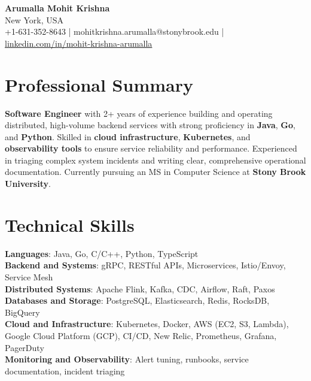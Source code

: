 \documentclass[letterpaper,11pt]{article}
\begin{document}
\begin{center}
  {\Large \textbf{Arumalla Mohit Krishna}} \\
  New York, USA \\
  +1-631-352-8643 \enspace | \enspace mohitkrishna.arumalla@stonybrook.edu \enspace | \enspace \href{https://www.linkedin.com/in/mohit-krishna-arumalla}{linkedin.com/in/mohit-krishna-arumalla}
\end{center}

\section{Professional Summary}
  \begin{itemize}[leftmargin=0.15in, label={}]
    \small{\item{
     \textbf{Software Engineer} with 2+ years of experience building and operating distributed, high-volume backend services with strong proficiency in \textbf{Java}, \textbf{Go}, and \textbf{Python}. Skilled in \textbf{cloud infrastructure}, \textbf{Kubernetes}, and \textbf{observability tools} to ensure service reliability and performance. Experienced in triaging complex system incidents and writing clear, comprehensive operational documentation. Currently pursuing an MS in Computer Science at \textbf{Stony Brook University}.
    }}
  \end{itemize}
\vspace{-16pt}

\section{Technical Skills}
 \begin{itemize}[leftmargin=0.15in, label={}]
    \small{\item{
     \textbf{Languages}: Java, Go, C/C++, Python, TypeScript \\
     \textbf{Backend and Systems}: gRPC, RESTful APIs, Microservices, Istio/Envoy, Service Mesh \\
     \textbf{Distributed Systems}: Apache Flink, Kafka, CDC, Airflow, Raft, Paxos \\
     \textbf{Databases and Storage}: PostgreSQL, Elasticsearch, Redis, RocksDB, BigQuery \\
     \textbf{Cloud and Infrastructure}: Kubernetes, Docker, AWS (EC2, S3, Lambda), Google Cloud Platform (GCP), CI/CD, New Relic, Prometheus, Grafana, PagerDuty \\
     \textbf{Monitoring and Observability}: Alert tuning, runbooks, service documentation, incident triaging
    }}
 \end{itemize}
\vspace{-16pt}
\end{document}
